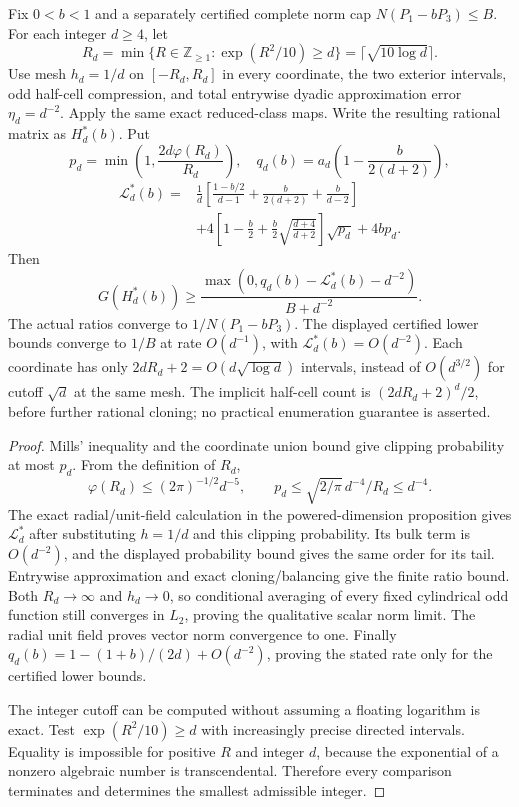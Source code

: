 \begin{proposition}
\label{prop:new-log-cutoff-sequence}
Fix $0<b<1$ and a separately certified complete norm cap
$N(P_1-bP_3)\leq B$.  For each integer $d\geq4$, let
\[
 R_d=\min\{R\in\mathbb Z_{\geq1}:\exp(R^2/10)\geq d\}
           =\lceil\sqrt{10\log d}\rceil.
\]
Use mesh $h_d=1/d$ on $[-R_d,R_d]$ in every coordinate, the two
exterior intervals, odd half-cell compression, and total entrywise
dyadic approximation error $\eta_d=d^{-2}$.  Apply the same exact
reduced-class maps.  Write the resulting rational matrix as $H_d^*(b)$.
Put
\[
 p_d=\min\left(1,\frac{2d\varphi(R_d)}{R_d}\right),\quad
 q_d(b)=a_d\left(1-\frac b{2(d+2)}\right),
\]
\begin{align*}
 \mathcal L_d^*(b)={}&\frac1d
 \left[\frac{1-b/2}{d-1}+\frac b{2(d+2)}+\frac b{d-2}\right]\\
 &+4\left[1-\frac b2+\frac b2\sqrt{\frac{d+4}{d+2}}\right]
                                      \sqrt{p_d}+4bp_d.
\end{align*}
Then
\[
 G(H_d^*(b))\geq
 \frac{\max(0,q_d(b)-\mathcal L_d^*(b)-d^{-2})}{B+d^{-2}}.
\]
The actual ratios converge to $1/N(P_1-bP_3)$.
The displayed certified lower bounds converge to $1/B$ at rate
$O(d^{-1})$, with $\mathcal L_d^*(b)=O(d^{-2})$.
Each coordinate has only $2dR_d+2=O(d\sqrt{\log d})$ intervals,
instead of $O(d^{3/2})$ for cutoff $\sqrt d$ at the same mesh.
The implicit half-cell count is $(2dR_d+2)^d/2$, before further
rational cloning; no practical enumeration guarantee is asserted.
\end{proposition}
\begin{proof}
Mills' inequality and the coordinate union bound give clipping
probability at most $p_d$.  From the definition of $R_d$,
\[
 \varphi(R_d)\leq(2\pi)^{-1/2}d^{-5},\qquad
 p_d\leq\sqrt{2/\pi}\,d^{-4}/R_d\leq d^{-4}.
\]
The exact radial/unit-field calculation in the powered-dimension
proposition gives $\mathcal L_d^*$ after substituting $h=1/d$ and
this clipping probability.  Its bulk term is $O(d^{-2})$, and
the displayed probability bound gives the same order for its tail.
Entrywise approximation and exact cloning/balancing give the finite
ratio bound.  Both $R_d\to\infty$ and $h_d\to0$, so conditional
averaging of every fixed cylindrical odd function still converges
in $L_2$, proving the qualitative scalar norm limit.  The radial
unit field proves vector norm convergence to one.
Finally $q_d(b)=1-(1+b)/(2d)+O(d^{-2})$, proving the stated
rate only for the certified lower bounds.

The integer cutoff can be computed without assuming a floating
logarithm is exact.  Test $\exp(R^2/10)\geq d$ with increasingly
precise directed intervals.  Equality is impossible for positive
$R$ and integer $d$, because the exponential of a nonzero algebraic
number is transcendental.  Therefore every comparison terminates
and determines the smallest admissible integer.
\end{proof}

